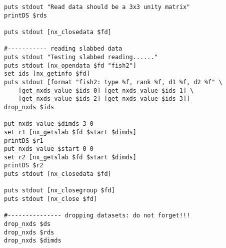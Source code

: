 \documentclass[12pt,a4paper]{article}
\begin{document}
\begin{verbatim}
puts stdout "Read data should be a 3x3 unity matrix"
printDS $rds

puts stdout [nx_closedata $fd]

#----------- reading slabbed data
puts stdout "Testing slabbed reading......"
puts stdout [nx_opendata $fd "fish2"]
set ids [nx_getinfo $fd]
puts stdout [format "fish2: type %f, rank %f, d1 %f, d2 %f" \
	[get_nxds_value $ids 0] [get_nxds_value $ids 1] \
	[get_nxds_value $ids 2] [get_nxds_value $ids 3]]
drop_nxds $ids

put_nxds_value $dimds 3 0
set r1 [nx_getslab $fd $start $dimds]
printDS $r1
put_nxds_value $start 0 0
set r2 [nx_getslab $fd $start $dimds]
printDS $r2
puts stdout [nx_closedata $fd]

puts stdout [nx_closegroup $fd]
puts stdout [nx_close $fd]

#--------------- dropping datasets: do not forget!!!
drop_nxds $ds
drop_nxds $rds
drop_nxds $dimds
\end{verbatim}
\end{document}
